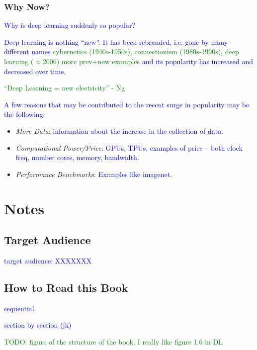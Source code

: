 \subsubsection{Why Now?}

\textcolor{blue}{Why is deep learning suddenly so popular?}

\textcolor{blue}{Deep learning is nothing ``new''. It has been rebranded, i.e. gone by many different names \textcolor{green}{cybernetics (1940s-1950s), connectionism (1980s-1990s), deep learning ($\approx 2006$) more prev+new examples} and its popularity has increased and decreased over time.}

\textcolor{green}{``Deep Learning = new electricity'' - Ng}

\textcolor{blue}{A few reasons that may be contributed to the recent surge in popularity may be the following:}

\begin{itemize}
	
	\item \textit{More Data}: \textcolor{blue}{information about the increase in the collection of data}.
	
	\item \textit{Computational Power/Price}: \textcolor{blue}{GPUs, TPUs, examples of price -- both clock freq, number cores, memory, bandwidth}.
	
	\item \textit{Performance Benchmarks}: \textcolor{blue}{Examples like imagenet}.
	
\end{itemize}


\section{Notes}

\subsection{Target Audience}
\textcolor{blue}{target audience: XXXXXXX}

\subsection{How to Read this Book}
\textcolor{blue}{sequential}

\textcolor{blue}{section by section (jk)}

\textcolor{green}{TODO: figure of the structure of the book. I really like figure 1.6 in DL}


